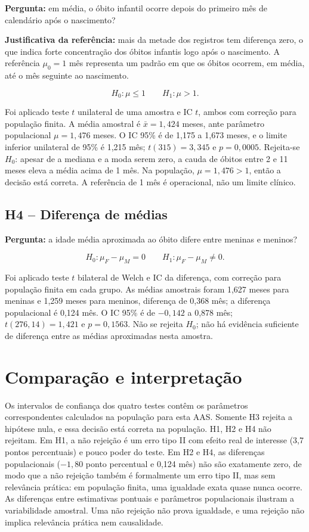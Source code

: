\documentclass[12pt]{article}
\begin{document}
\textbf{Pergunta:} em média, o óbito infantil ocorre depois do primeiro mês de calendário após o nascimento?

\textbf{Justificativa da referência:} mais da metade dos registros tem diferença zero, o que indica forte concentração dos óbitos infantis logo após o nascimento. A referência \(\mu_0=1\) mês representa um padrão em que os óbitos ocorrem, em média, até o mês seguinte ao nascimento.

\[
H_0: \mu\le 1
\qquad
H_1: \mu> 1.
\]

Foi aplicado teste \(t\) unilateral de uma amostra e IC \(t\), ambos com correção para população finita. A média amostral é \(\bar{x}=1{,}424\) meses, ante parâmetro populacional \(\mu=1{,}476\) meses. O IC 95\% é de 1,175 a 1,673 meses, e o limite inferior unilateral de 95\% é 1,215 mês; \(t(315)=3{,}345\) e \(p=0{,}0005\). Rejeita-se \(H_0\): apesar de a mediana e a moda serem zero, a cauda de óbitos entre 2 e 11 meses eleva a média acima de 1 mês. Na população, \(\mu=1{,}476>1\), então a decisão está correta. A referência de 1 mês é operacional, não um limite clínico.

\subsection{H4 -- Diferença de médias}

\textbf{Pergunta:} a idade média aproximada ao óbito difere entre meninas e meninos?

\[
H_0: \mu_F-\mu_M=0
\qquad
H_1: \mu_F-\mu_M\ne 0.
\]

Foi aplicado teste \(t\) bilateral de Welch e IC da diferença, com correção para população finita em cada grupo. As médias amostrais foram 1,627 meses para meninas e 1,259 meses para meninos, diferença de 0,368 mês; a diferença populacional é 0,124 mês. O IC 95\% é de \(-0{,}142\) a 0,878 mês; \(t(276{,}14)=1{,}421\) e \(p=0{,}1563\). Não se rejeita \(H_0\); não há evidência suficiente de diferença entre as médias aproximadas nesta amostra.

\section{Comparação e interpretação}

Os intervalos de confiança dos quatro testes contêm os parâmetros correspondentes calculados na população para esta AAS. Somente H3 rejeita a hipótese nula, e essa decisão está correta na população. H1, H2 e H4 não rejeitam. Em H1, a não rejeição é um erro tipo II com efeito real de interesse (3,7 pontos percentuais) e pouco poder do teste. Em H2 e H4, as diferenças populacionais (\(-1{,}80\) ponto percentual e 0,124 mês) não são exatamente zero, de modo que a não rejeição também é formalmente um erro tipo II, mas sem relevância prática: em população finita, uma igualdade exata quase nunca ocorre. As diferenças entre estimativas pontuais e parâmetros populacionais ilustram a variabilidade amostral. Uma não rejeição não prova igualdade, e uma rejeição não implica relevância prática nem causalidade.
\end{document}

